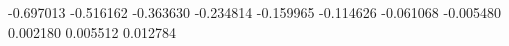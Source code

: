 -0.697013
-0.516162
-0.363630
-0.234814
-0.159965
-0.114626
-0.061068
-0.005480
0.002180
0.005512
0.012784
